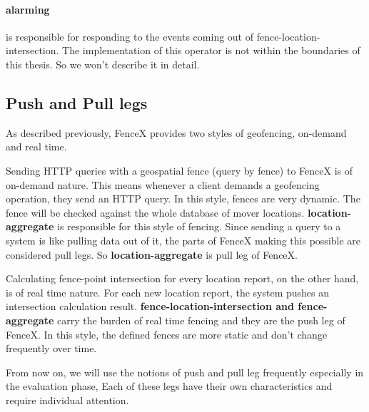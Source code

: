 \documentclass[a4]{report}
\begin{document}
    \paragraph{alarming} is responsible for responding to the events coming out of fence-location-intersection.
    The implementation of this operator is not within the boundaries of this thesis.
    So we won't describe it in detail.

    \subsection{Push and Pull legs}
    As described previously, FenceX provides two styles of geofencing, on-demand and real time.

    Sending HTTP queries with a geospatial fence (query by fence) to FenceX is of on-demand nature.
    This means whenever a client demands a geofencing operation, they send an HTTP query.
    In this style, fences are very dynamic.
    The fence will be checked against the whole database of mover locations.
    \textbf{location-aggregate} is responsible for this style of fencing.
    Since sending a query to a system is like pulling data out of it, the parts of FenceX making this possible are considered pull legs.
    So \textbf{location-aggregate} is pull leg of FenceX.

    Calculating fence-point intersection for every location report, on the other hand, is of real time nature.
    For each new location report, the system pushes an intersection calculation result.
    \textbf{fence-location-intersection and fence-aggregate} carry the burden of real time fencing and they are the push leg of FenceX.
    In this style, the defined fences are more static and don't change frequently over time.

    From now on, we will use the notions of push and pull leg frequently especially in the evaluation phase, Each of
    these legs have their own characteristics and require individual attention.
\end{document}
